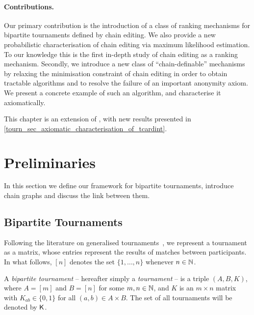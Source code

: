 \paragraph{Contributions.}

Our primary contribution is the introduction of a
class of ranking mechanisms for bipartite tournaments defined by chain editing.
We also provide a new probabilistic characterisation of chain editing via
maximum likelihood estimation. To our knowledge this is the first in-depth
study of chain editing as a ranking mechanism. Secondly, we introduce a new
class of ``chain-definable'' mechanisms by relaxing the minimisation constraint
of chain editing in order to obtain tractable algorithms and to resolve the
failure of an important anonymity axiom. We present a concrete example of such
an algorithm, and characterise it axiomatically.

This chapter is an extension of \textcite{singleton_booth_bipartite}, with new
results presented in \cref{tourn_sec_axiomatic_characterisation_of_tcardint}.

\section{Preliminaries}
\label{tourn_sec_preliminaries}

In this section we define our framework for bipartite tournaments, introduce
chain graphs and discuss the link between them.

\subsection{Bipartite Tournaments}

Following the literature on generalised
tournaments~\cite{gonzalez2014paired, slutzki2005ranking,
csato2019impossibility}, we represent a tournament as a matrix, whose entries
represent the results of matches between participants. In what follows, $[n]$
denotes the set $\{1,\ldots,n\}$ whenever $n \in \mathbb{N}$.

\begin{definition}%

    A \emph{bipartite tournament} -- hereafter simply a \emph{tournament} -- is
    a triple $(A, B, K)$, where $A = [m]$ and $B = [n]$ for some $m, n \in \mathbb{N}$,
    and $K$ is an $m \times n$ matrix with $K_{ab} \in \{0, 1\}$ for all $(a,
    b) \in A \times B$. The set of all tournaments will be denoted by $\mathsf{K}$.

\end{definition}

